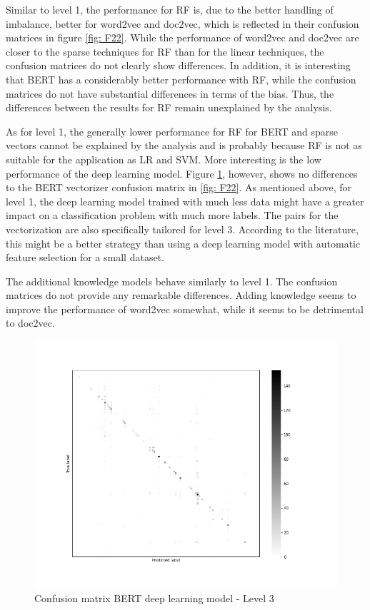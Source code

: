 \documentclass[12pt, a4paper, titlepage]{article}
\begin{document}
Similar to level 1, the performance for \ac{RF} is, due to the better handling of imbalance, better for word2vec and doc2vec, which is reflected in their confusion matrices in figure \ref{fig: F22}. While the performance of word2vec and doc2vec are closer to the sparse techniques for \ac{RF} than for the linear techniques, the confusion matrices do not clearly show differences. In addition, it is interesting that \ac{BERT} has a considerably better performance with \ac{RF}, while the confusion matrices do not have substantial differences in terms of the bias. Thus, the differences between the results for \ac{RF} remain unexplained by the analysis.

As for level 1, the generally lower performance for \ac{RF} for \ac{BERT} and sparse vectors cannot be explained by the analysis and is probably because \ac{RF} is not as suitable for the application as \ac{LR} and \ac{SVM}. More interesting is the low performance of the deep learning model. Figure \ref{fig: F26}, however, shows no differences to the \ac{BERT} vectorizer confusion matrix in \ref{fig: F22}. As mentioned above, for level 1, the deep learning model trained with much less data might have a greater impact on a classification problem with much more labels. The pairs for the vectorization are also specifically tailored for level 3. According to the literature, this might be a better strategy than using a deep learning model with automatic feature selection for a small dataset. 

The additional knowledge models behave similarly to level 1. The confusion matrices do not provide any remarkable differences. Adding knowledge seems to improve the performance of word2vec somewhat, while it seems to be detrimental to doc2vec.

\begin{figure}[hb!]
  \center
  \includegraphics[scale=0.5]{cm_bert_clf_3.jpg}
  \caption{\label{fig: F26} Confusion matrix BERT deep learning model - Level 3}
\end{figure}
\end{document}
